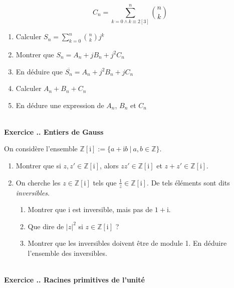 \documentclass{article}
\newcommand{\mb}[1]{\mathbb{#1}}
\newcounter{exo}
\newcommand{\exercice}[1][\null]{\textbf{\\ \large Exercice \thesection.\theexo. \normalsize #1} \addtocounter{exo}{1}}
\begin{document}
\begin{equation*}
    C_n = \sum_{k = 0 \wedge k \equiv 2 [3]}^{n} { n \choose k} 
\end{equation*}

\begin{enumerate}
    \item Calculer $S_n = \sum_{k = 0}^n { n \choose k } j^k$
    \item Montrer que $S_n = A_n + j B_n + j^2 C_n$
    \item En déduire que $\overline{S_n} = A_n + j^2 B_n + jC_n$
    \item Calculer $A_n + B_n + C_n$
    \item En dédure une expression de $A_n$, $B_n$ et $C_n$
\end{enumerate}


\exercice[Entiers de Gauss]

On considère l'ensemble $\mb{Z}[\text{i}] := \{a + \text{i}b~|~a, b \in \mb{Z}\}$.

\begin{enumerate}

\item Montrer que si $z, z' \in \mb{Z}[\text{i}]$, alors $zz' \in \mb{Z}[\text{i}]$ et $z+z' \in \mb{Z}[\text{i}]$.

\item On cherche les $z \in \mb{Z}[\text{i}] $ tels que $ \frac{1}{z} \in \mb{Z}[\text{i}]$. De tels éléments sont dits \emph{inversibles}.

\begin{enumerate}

\item Montrer que $\text{i}$ est inversible, mais pas de $1+ \text{i}$.

\item Que dire de $|z|^2$ si $z \in \mb{Z}[\text{i}]$ ?

\item Montrer que les inversibles doivent être de module 1. En déduire l'ensemble des inversibles.


\end{enumerate}


\end{enumerate}








\exercice[Racines primitives de l'unité]
\end{document}
